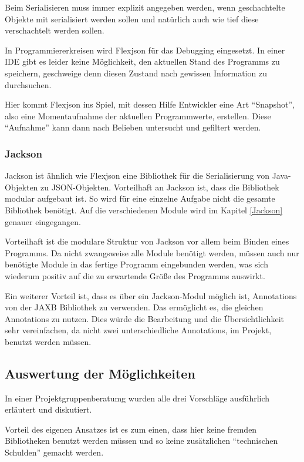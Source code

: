 Beim Serialisieren muss immer explizit angegeben werden, wenn geschachtelte Objekte mit serialisiert werden sollen und nat\"urlich auch wie tief diese verschachtelt werden sollen.

In Programmiererkreisen wird Flexjson f\"ur das Debugging eingesetzt. In einer IDE gibt es leider keine M\"oglichkeit, den aktuellen Stand des Programms zu speichern, geschweige denn diesen Zustand nach gewissen Information zu durchsuchen. \cite{FlexJSONDebug}

Hier kommt Flexjson ins Spiel, mit dessen Hilfe Entwickler eine Art "`Snapshot"', also eine Momentaufnahme der aktuellen Programmwerte, erstellen. Diese "`Aufnahme"' kann dann nach Belieben untersucht und gefiltert werden.

\subsubsection{Jackson}
Jackson ist \"ahnlich wie Flexjson eine Bibliothek f\"ur die Serialisierung von Java-Objekten zu \ac{JSON}-Objekten. Vorteilhaft an Jackson ist, dass die Bibliothek modular aufgebaut ist. So wird f\"ur eine einzelne Aufgabe nicht die gesamte Bibliothek ben\"otigt. Auf die verschiedenen Module wird im Kapitel \ref{Jackson} genauer eingegangen.

Vorteilhaft ist die modulare Struktur von Jackson vor allem beim Binden eines Programms. Da nicht zwangsweise alle Module ben\"otigt werden, m\"ussen auch nur ben\"otigte Module in das fertige Programm eingebunden werden, was sich wiederum positiv auf die zu erwartende Gr\"o\ss{}e des Programms auswirkt.
\cite{Jackson}

Ein weiterer Vorteil ist, dass es \"uber ein Jackson-Modul m\"oglich ist, Annotations von der \ac{JAXB} Bibliothek zu verwenden. Das
erm\"oglicht es, die gleichen Annotations zu nutzen. Dies w\"urde die Bearbeitung und die \"Ubersichtlichkeit sehr vereinfachen, da nicht zwei unterschiedliche Annotations, im Projekt, benutzt werden m\"ussen.

\subsection{Auswertung der M\"oglichkeiten}
In einer Projektgruppenberatumg wurden alle drei Vorschl\"age ausf\"uhrlich erl\"autert und diskutiert. 

Vorteil des eigenen Ansatzes ist es zum einen, dass hier keine fremden Bibliotheken benutzt werden m\"ussen und so keine zus\"atzlichen "`technischen Schulden"' gemacht werden. 

